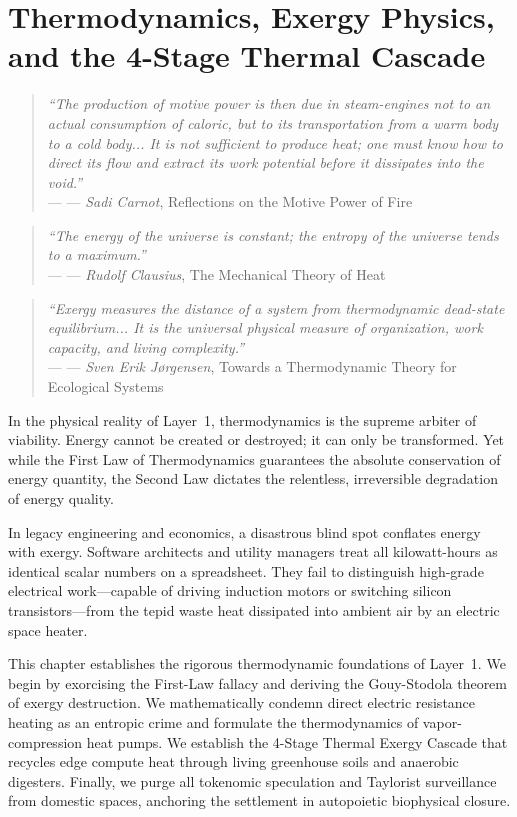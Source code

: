 \chapter{Thermodynamics, Exergy Physics, and the 4-Stage Thermal Cascade}
\label{chap:layer1_thermodynamics}

\providecommand{\epigraph}[2]{%
  \begin{quote}
    \textit{#1} \\
    \raggedleft--- #2
  \end{quote}
}

\epigraph{
    ``The production of motive power is then due in steam-engines not to an actual consumption of caloric, but to its transportation from a warm body to a cold body... It is not sufficient to produce heat; one must know how to direct its flow and extract its work potential before it dissipates into the void.''
}{--- \textit{Sadi Carnot}, \textnormal{Reflections on the Motive Power of Fire} \cite{carnot1824motrice}}

\epigraph{
    ``The energy of the universe is constant; the entropy of the universe tends to a maximum.''
}{--- \textit{Rudolf Clausius}, \textnormal{The Mechanical Theory of Heat} \cite{clausius1865mechanical}}

\epigraph{
    ``Exergy measures the distance of a system from thermodynamic dead-state equilibrium... It is the universal physical measure of organization, work capacity, and living complexity.''
}{--- \textit{Sven Erik J{\o}rgensen}, \textnormal{Towards a Thermodynamic Theory for Ecological Systems} \cite{jorgensen2004towards}}

In the physical reality of Layer~1, thermodynamics is the supreme arbiter of viability. Energy cannot be created or destroyed; it can only be transformed. Yet while the First Law of Thermodynamics guarantees the absolute conservation of energy quantity, the Second Law dictates the relentless, irreversible degradation of energy quality.

In legacy engineering and economics, a disastrous blind spot conflates energy with exergy. Software architects and utility managers treat all kilowatt-hours as identical scalar numbers on a spreadsheet. They fail to distinguish high-grade electrical work---capable of driving induction motors or switching silicon transistors---from the tepid waste heat dissipated into ambient air by an electric space heater. 

This chapter establishes the rigorous thermodynamic foundations of Layer~1. We begin by exorcising the First-Law fallacy and deriving the Gouy-Stodola theorem of exergy destruction. We mathematically condemn direct electric resistance heating as an entropic crime and formulate the thermodynamics of vapor-compression heat pumps. We establish the 4-Stage Thermal Exergy Cascade that recycles edge compute heat through living greenhouse soils and anaerobic digesters. Finally, we purge all tokenomic speculation and Taylorist surveillance from domestic spaces, anchoring the settlement in autopoietic biophysical closure.

